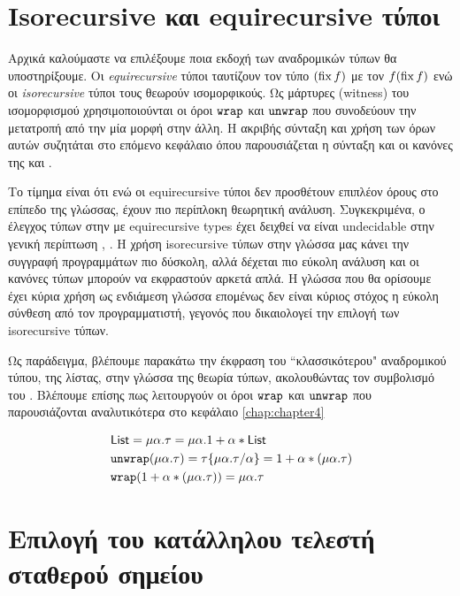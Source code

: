 \section{Isorecursive και equirecursive τύποι}
\label{sec:rectypes-intro}


Αρχικά καλούμαστε να επιλέξουμε ποια εκδοχή των αναδρομικών τύπων
θα υποστηρίξουμε.
Οι \emph{equirecursive} τύποι ταυτίζουν τον τύπο $(\operatorname{fix} f)$ με τον $f (\operatorname{fix} f)$ ενώ οι 
\emph{isorecursive} τύποι τους θεωρούν ισομορφικούς. Ως μάρτυρες (witness) του ισομορφισμού
χρησιμοποιούνται οι όροι $\operatorname{\texttt{wrap}}$ και $\operatorname{\texttt{unwrap}}$ που συνοδεύουν  την μετατροπή από 
την μία μορφή στην άλλη. Η ακριβής σύνταξη και χρήση των όρων αυτών συζητάται στο επόμενο
κεφάλαιο όπου παρουσιάζεται η σύνταξη και οι κανόνες της \FOMF{} και \FIR{}. 

Το τίμημα είναι ότι ενώ οι equirecursive τύποι δεν προσθέτουν επιπλέον όρους στο επίπεδο
της γλώσσας, έχουν πιο περίπλοκη θεωρητική ανάλυση. Συγκεκριμένα, ο έλεγχος τύπων
στην \FOMF{} με equirecursive types έχει δειχθεί να είναι undecidable στην γενική περίπτωση
\cite{dreyer2007}, \cite{cai}. Η χρήση isorecursive τύπων στην γλώσσα μας κάνει την συγγραφή
προγραμμάτων πιο δύσκολη, αλλά δέχεται πιο εύκολη ανάλυση και οι κανόνες τύπων μπορούν
να εκφραστούν αρκετά απλά. Η γλώσσα που θα ορίσουμε έχει κύρια χρήση ως ενδιάμεση γλώσσα
επομένως δεν είναι κύριος στόχος η εύκολη σύνθεση από τον προγραμματιστή, γεγονός που
δικαιολογεί την επιλογή των isorecursive τύπων.

Ως παράδειγμα, βλέπουμε παρακάτω την έκφραση του ``κλασσικότερου" αναδρομικού
τύπου, της λίστας, στην γλώσσα της θεωρία τύπων, ακολουθώντας τον συμβολισμό του \cite{wadler:free-rectypes}. Βλέπουμε επίσης πως λειτουργούν οι όροι $\operatorname{\texttt{wrap}}$ και $\operatorname{\texttt{unwrap}}$ που παρουσιάζονται αναλυτικότερα
στο κεφάλαιο \ref{chap:chapter4}

\begin{align*}
       &  \operatorname{\textsf{List}} = \mu \alpha. \tau = \mu \alpha. 1 + \alpha*\operatorname{\textsf{List}} \\
  &       \operatorname{\texttt{unwrap}} (\mu \alpha. \tau) = \tau\{\mu \alpha. \tau / \alpha\} =
         1 + \alpha * (\mu \alpha. \tau) \\
     &   \operatorname{\texttt{wrap}} ( 1 + \alpha * (\mu \alpha. \tau)) =
         \mu \alpha. \tau \\
\end{align*}





\section{Επιλογή του κατάλληλου τελεστή σταθερού σημείου}
\label{sec:fixpoint_choice}

